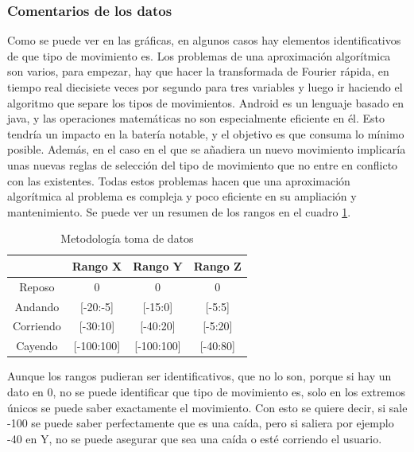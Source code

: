\documentclass[12pt]{article}
\numberwithin{equation}{section}
\begin{document}
\subsubsection{Comentarios de los datos}

Como se puede ver en las gráficas, en algunos casos hay elementos identificativos de que tipo de movimiento es. Los problemas de una aproximación algorítmica son varios, para empezar, hay que hacer la transformada de Fourier rápida, en tiempo real diecisiete veces por segundo para tres variables y luego ir haciendo el algoritmo que separe los tipos de movimientos. Android es un lenguaje basado en java, y las operaciones matemáticas no son especialmente eficiente en él. Esto tendría un impacto en la batería notable, y el objetivo es que consuma lo mínimo posible. Además, en el caso en el que se añadiera un nuevo movimiento implicaría unas nuevas reglas de selección del tipo de movimiento que no entre en conflicto con las existentes. Todas estos problemas hacen que una aproximación algorítmica al problema es compleja y poco eficiente en su ampliación y mantenimiento. Se puede ver un resumen de los rangos en el cuadro \ref{table1}.

\begin{center}
\begin{table}
\caption{Metodología toma de datos}
\begin{center}
\begin{tabular}{| c | c | c | c |}
\hline
 & Rango X & Rango Y & Rango Z \\
\hline
Reposo & 0 & 0 & 0\\
\hline
Andando & [-20:-5] & [-15:0] & [-5:5] \\
\hline
Corriendo & [-30:10] & [-40:20] & [-5:20] \\
\hline
Cayendo & [-100:100] & [-100:100] & [-40:80] \\
\hline
\end{tabular}
\end{center}
\label{table1}
\end{table}
\end{center}


Aunque los rangos pudieran ser identificativos, que no lo son, porque si hay un dato en 0, no se puede identificar que tipo de movimiento es, solo en los extremos únicos se puede saber exactamente el movimiento. Con esto se quiere decir, si sale -100 se puede saber perfectamente que es una caída, pero si saliera por ejemplo -40 en Y, no se puede asegurar que sea una caída o esté corriendo el usuario.
\end{document}
